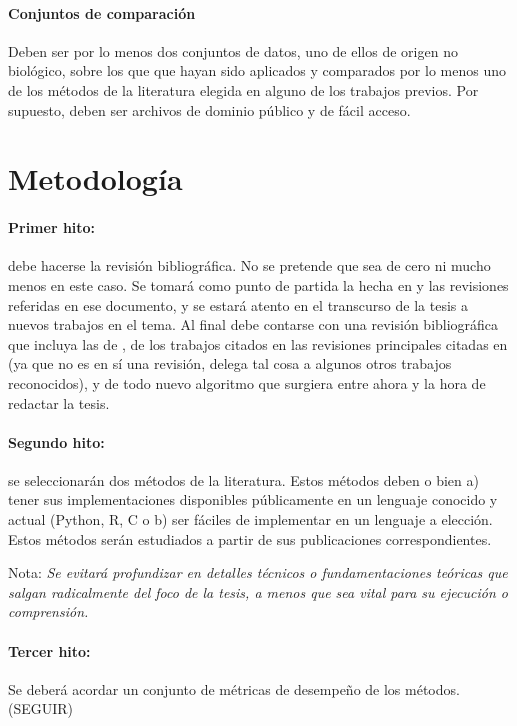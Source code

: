\documentclass{article}
\theoremstyle{definition}
\begin{document}
\paragraph{Conjuntos de comparación} Deben ser por lo menos dos conjuntos de datos, uno de ellos de origen no biológico, sobre los que que hayan sido  aplicados y comparados por lo menos uno de los métodos de la literatura elegida en alguno de los trabajos previos. Por supuesto, deben ser archivos de dominio público y de fácil acceso.


\section{Metodología}

\paragraph{Primer hito:} debe hacerse la revisión bibliográfica. No se pretende que sea de cero ni mucho menos en este caso. Se tomará como punto de partida la hecha en \cite{bmf} y las revisiones referidas en ese documento, y se estará atento en el transcurso de la tesis a nuevos trabajos en el tema. Al final debe contarse con una revisión bibliográfica que incluya las de \cite{bmf}, de los trabajos citados en las revisiones principales citadas en \cite{bmf} (ya que no es en sí una revisión, delega tal cosa a algunos otros trabajos reconocidos), y de todo nuevo algoritmo que surgiera entre ahora y la hora de redactar la tesis.

\paragraph{Segundo hito:} se seleccionarán dos métodos de la literatura. Estos métodos deben o bien a) tener sus implementaciones disponibles públicamente en un lenguaje conocido y actual (Python, R, C o b) ser fáciles de implementar en un lenguaje a elección. Estos métodos serán estudiados a partir de sus publicaciones correspondientes. 

Nota: \emph{Se evitará profundizar en detalles técnicos o fundamentaciones teóricas que salgan radicalmente del foco de la tesis, a menos que sea vital para su ejecución o comprensión.}

\paragraph{Tercer hito:} Se deberá acordar un conjunto de métricas de desempeño de los métodos. (SEGUIR)
\end{document}
